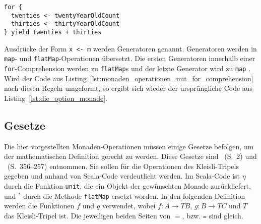 \begin{lstlisting}[caption=Monaden-Operationen mit for-Comprehension, label=lst:monaden_operationen_mit_for_comprehension]
for {
  twenties <- twentyYearOldCount
  thirties <- thirtyYearOldCount
} yield twenties + thirties
\end{lstlisting}

Ausdrücke der Form \lstinline|x <- m| werden Generatoren genannt.
Generatoren werden in \lstinline|map|- und \lstinline|flatMap|-Operationen übersetzt.
Die ersten Generatoren innerhalb einer \lstinline|for|-Comprehension werden zu \lstinline|flatMap|s und der letzte Generator wird zu \lstinline|map| \cite[vgl.][S.~490]{programming_in_scala}.
Wird der Code aus Listing~\ref{lst:monaden_operationen_mit_for_comprehension} nach diesen Regeln umgeformt, so ergibt sich wieder der ursprüngliche Code aus Listing~\ref{lst:die_option_monade}.


\subsection{Gesetze} %
\label{sub:monadische_gesetze}

Die hier vorgestellten Monaden-Operationen müssen einige Gesetze befolgen, um der mathematischen Definition gerecht zu werden.
Diese Gesetze sind \citealt{monads_program_structure}~(S.~2) und \citealt{real_world_haskell}~(S.~356--257) entnommen.
Sie sollen für die Operationen des Kleisli-Tripels gegeben und anhand von Scala-Code verdeutlicht werden.
Im Scala-Code ist $\eta$ durch die Funktion \lstinline|unit|, die ein Objekt der gewünschten Monade zurückliefert, und $^*$ durch die Methode \lstinline|flatMap| ersetzt worden.
In den folgenden Definition werden die Funktionen $f$ und $g$ verwendet, wobei $f: A \to T B$, $g: B \to T C$ und $T$ das Kleisli-Tripel ist.
Die jeweiligen beiden Seiten von $=$, bzw. \lstinline|=| sind gleich.

